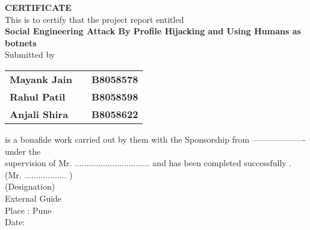 \begin{center}
\thispagestyle{empty}
\vspace*{4\baselineskip}
\LARGE{\textbf{CERTIFICATE}}\\[1.0cm]
\large{This is to certify that the project report entitled}\\[0.7cm]
\Large{\textbf{Social Engineering Attack By Profile Hijacking and Using Humans as botnets}}\\[0.7cm]
\normalsize{Submitted by}\\[0.3cm]
\end{center}
\begin{table}[h]\large
\centering
\begin{tabular}{>{\bfseries}lc>{\bfseries}r}
Mayank Jain & & B8058578\\ %
Rahul Patil & & B8058598\\ %
Anjali Shira & & B8058622\\ %
\end{tabular}
\end{table}
\normalsize{is a bonafide work carried out by them with the Sponsorship from ------------------- under the
\\supervision of Mr. ................................ and has been completed successfully .}\\[1.5cm]
\normalsize{(Mr. .................. )}\\
\normalsize{(Designation)}\\
\normalsize{External Guide}\\[1cm]
\normalsize{Place : Pune}\\
\normalsize{Date:}\\
\newpage
